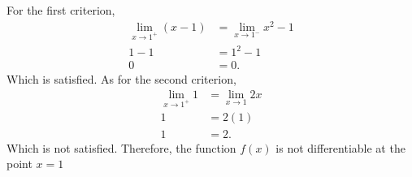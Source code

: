 \documentclass[a4paper]{article}
\begin{document}
\noindent For the first criterion,
\begin{align*}
	\lim_{x \to 1^{+}} (x - 1) &= \lim_{x \to 1^{-}} x^2 - 1 \\ 
	1 - 1 &= 1^2 - 1 \\
	0 &=  0 
.\end{align*}
\noindent Which is satisfied. As for the second criterion,
\begin{align*}
	\lim_{x \to 1^{+}} 1 &= \lim_{x \to 1} 2x  \\ 
	1 &= 2(1) \\
	1 &= 2
.\end{align*}
Which is not satisfied. Therefore, the function $f(x)$ is not differentiable at the point $x = 1$
\end{document}
